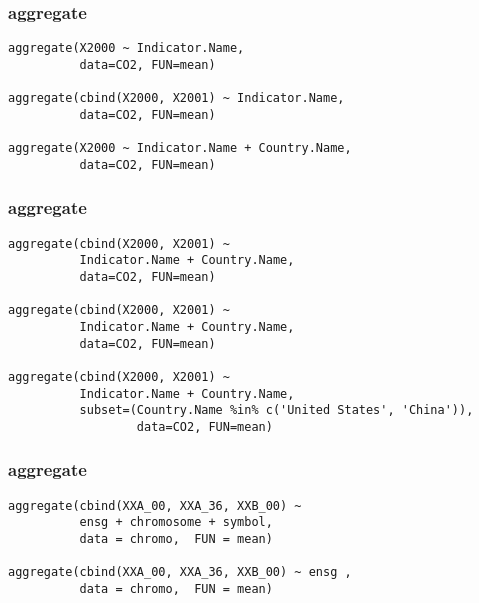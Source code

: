 \documentclass[xcolor={usenames,svgnames,dvipsnames}]{beamer}
\begin{document}
\begin{frame}[fragile]
\frametitle{aggregate}
\label{sec-3-5}


\lstset{language=R}
\begin{lstlisting}
aggregate(X2000 ~ Indicator.Name,
          data=CO2, FUN=mean)

aggregate(cbind(X2000, X2001) ~ Indicator.Name,
          data=CO2, FUN=mean)

aggregate(X2000 ~ Indicator.Name + Country.Name,
          data=CO2, FUN=mean)
\end{lstlisting}
\end{frame}
\begin{frame}[fragile]
\frametitle{aggregate}
\label{sec-3-6}


\lstset{language=R}
\begin{lstlisting}
aggregate(cbind(X2000, X2001) ~
          Indicator.Name + Country.Name,
          data=CO2, FUN=mean)

aggregate(cbind(X2000, X2001) ~
          Indicator.Name + Country.Name,
          data=CO2, FUN=mean)

aggregate(cbind(X2000, X2001) ~
          Indicator.Name + Country.Name,
          subset=(Country.Name %in% c('United States', 'China')),
                  data=CO2, FUN=mean)
\end{lstlisting}
\end{frame}
\begin{frame}[fragile]
\frametitle{aggregate}
\label{sec-3-7}


\lstset{language=R}
\begin{lstlisting}
aggregate(cbind(XXA_00, XXA_36, XXB_00) ~
          ensg + chromosome + symbol,
          data = chromo,  FUN = mean)

aggregate(cbind(XXA_00, XXA_36, XXB_00) ~ ensg ,
          data = chromo,  FUN = mean)
\end{lstlisting}
\end{frame}
\end{document}
